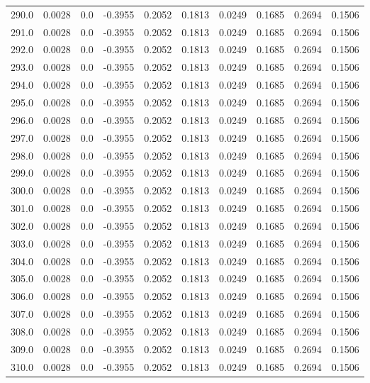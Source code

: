 \begin{longtable}{lrrrrrrrrr}
290.0 & 0.0028 & 0.0 & -0.3955 & 0.2052 & 0.1813 & 0.0249 & 0.1685 & 0.2694 & 0.1506 \\
291.0 & 0.0028 & 0.0 & -0.3955 & 0.2052 & 0.1813 & 0.0249 & 0.1685 & 0.2694 & 0.1506 \\
292.0 & 0.0028 & 0.0 & -0.3955 & 0.2052 & 0.1813 & 0.0249 & 0.1685 & 0.2694 & 0.1506 \\
293.0 & 0.0028 & 0.0 & -0.3955 & 0.2052 & 0.1813 & 0.0249 & 0.1685 & 0.2694 & 0.1506 \\
294.0 & 0.0028 & 0.0 & -0.3955 & 0.2052 & 0.1813 & 0.0249 & 0.1685 & 0.2694 & 0.1506 \\
295.0 & 0.0028 & 0.0 & -0.3955 & 0.2052 & 0.1813 & 0.0249 & 0.1685 & 0.2694 & 0.1506 \\
296.0 & 0.0028 & 0.0 & -0.3955 & 0.2052 & 0.1813 & 0.0249 & 0.1685 & 0.2694 & 0.1506 \\
297.0 & 0.0028 & 0.0 & -0.3955 & 0.2052 & 0.1813 & 0.0249 & 0.1685 & 0.2694 & 0.1506 \\
298.0 & 0.0028 & 0.0 & -0.3955 & 0.2052 & 0.1813 & 0.0249 & 0.1685 & 0.2694 & 0.1506 \\
299.0 & 0.0028 & 0.0 & -0.3955 & 0.2052 & 0.1813 & 0.0249 & 0.1685 & 0.2694 & 0.1506 \\
300.0 & 0.0028 & 0.0 & -0.3955 & 0.2052 & 0.1813 & 0.0249 & 0.1685 & 0.2694 & 0.1506 \\
301.0 & 0.0028 & 0.0 & -0.3955 & 0.2052 & 0.1813 & 0.0249 & 0.1685 & 0.2694 & 0.1506 \\
302.0 & 0.0028 & 0.0 & -0.3955 & 0.2052 & 0.1813 & 0.0249 & 0.1685 & 0.2694 & 0.1506 \\
303.0 & 0.0028 & 0.0 & -0.3955 & 0.2052 & 0.1813 & 0.0249 & 0.1685 & 0.2694 & 0.1506 \\
304.0 & 0.0028 & 0.0 & -0.3955 & 0.2052 & 0.1813 & 0.0249 & 0.1685 & 0.2694 & 0.1506 \\
305.0 & 0.0028 & 0.0 & -0.3955 & 0.2052 & 0.1813 & 0.0249 & 0.1685 & 0.2694 & 0.1506 \\
306.0 & 0.0028 & 0.0 & -0.3955 & 0.2052 & 0.1813 & 0.0249 & 0.1685 & 0.2694 & 0.1506 \\
307.0 & 0.0028 & 0.0 & -0.3955 & 0.2052 & 0.1813 & 0.0249 & 0.1685 & 0.2694 & 0.1506 \\
308.0 & 0.0028 & 0.0 & -0.3955 & 0.2052 & 0.1813 & 0.0249 & 0.1685 & 0.2694 & 0.1506 \\
309.0 & 0.0028 & 0.0 & -0.3955 & 0.2052 & 0.1813 & 0.0249 & 0.1685 & 0.2694 & 0.1506 \\
310.0 & 0.0028 & 0.0 & -0.3955 & 0.2052 & 0.1813 & 0.0249 & 0.1685 & 0.2694 & 0.1506 \\

\end{longtable}
